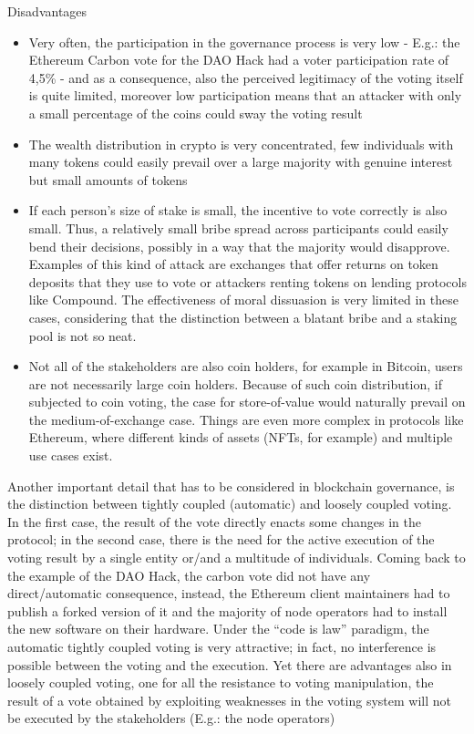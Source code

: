 \documentclass{article}
\begin{document}
Disadvantages

\begin{itemize}

\item Very often, the participation in the governance process is very low - E.g.: the Ethereum Carbon vote for the DAO Hack had a voter participation rate of 4,5\% -  and as a consequence, also the perceived legitimacy of the voting itself is quite limited, moreover low participation means that an attacker with only a small percentage of the coins could sway the voting result

\item The wealth distribution in crypto is very concentrated, few individuals with many tokens could easily prevail over a large majority with genuine interest but small amounts of tokens

\item If each person’s size of stake is small, the incentive to vote correctly is also small. Thus, a relatively small bribe spread across participants could easily bend their decisions, possibly in a way that the majority would disapprove. Examples of this kind of attack are exchanges that offer returns on token deposits that they use to vote or attackers renting tokens on lending protocols like Compound. The effectiveness of moral dissuasion is very limited in these cases, considering that the distinction between a blatant bribe and a staking pool is not so neat. 

\item Not all of the stakeholders are also coin holders, for example in Bitcoin, users are not necessarily large coin holders. Because of such coin distribution, if subjected to coin voting, the case for store-of-value would naturally prevail on the medium-of-exchange case. Things are even more complex in protocols like Ethereum, where different kinds of assets (NFTs, for example) and multiple use cases exist. 

\end{itemize}

Another important detail that has to be considered in blockchain governance, is the distinction between tightly coupled (automatic) and loosely coupled voting. In the first case, the result of the vote directly enacts some changes in the protocol; in the second case, there is the need for the active execution of the voting result by a single entity or/and a multitude of individuals. Coming back to the example of the DAO Hack, the carbon vote did not have any direct/automatic consequence, instead, the Ethereum client maintainers had to publish a forked version of it and the majority of node operators had to install the new software on their hardware. Under the “code is law” paradigm, the automatic tightly coupled voting is very attractive; in fact, no interference is possible between the voting and the execution. Yet there are advantages also in loosely coupled voting, one for all the resistance to voting manipulation, the result of a vote obtained by exploiting weaknesses in the voting system will not be executed by the stakeholders (E.g.: the node operators) 
\end{document}
